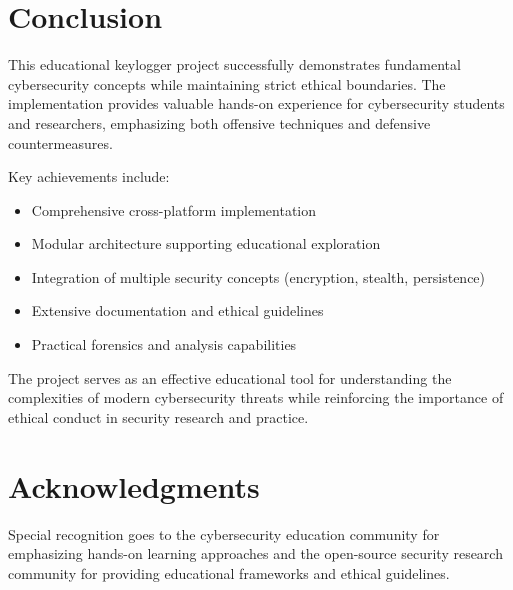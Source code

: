 \documentclass[12pt,a4paper]{article}
\begin{document}
\section{Conclusion}

This educational keylogger project successfully demonstrates fundamental cybersecurity concepts while maintaining strict ethical boundaries. The implementation provides valuable hands-on experience for cybersecurity students and researchers, emphasizing both offensive techniques and defensive countermeasures.

Key achievements include:

\begin{itemize}
    \item Comprehensive cross-platform implementation
    \item Modular architecture supporting educational exploration
    \item Integration of multiple security concepts (encryption, stealth, persistence)
    \item Extensive documentation and ethical guidelines
    \item Practical forensics and analysis capabilities
\end{itemize}

The project serves as an effective educational tool for understanding the complexities of modern cybersecurity threats while reinforcing the importance of ethical conduct in security research and practice.

\section{Acknowledgments}

Special recognition goes to the cybersecurity education community for emphasizing hands-on learning approaches and the open-source security research community for providing educational frameworks and ethical guidelines.
\end{document}
